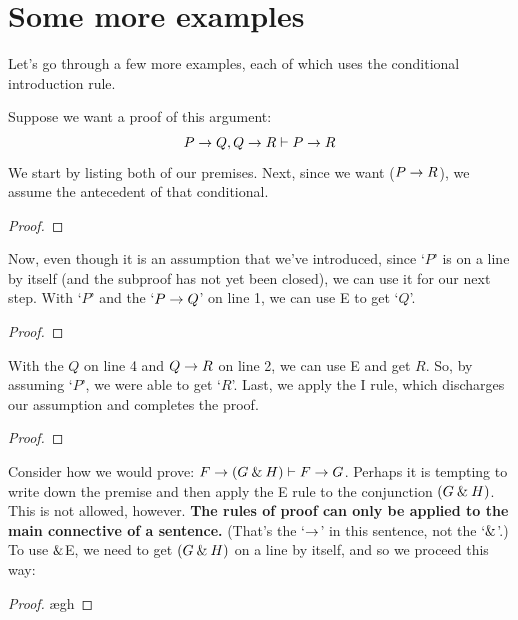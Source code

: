 \section{Some more examples}

Let's go through a few more examples, each of which uses the conditional introduction rule.

\begin{earg}
\item Suppose we want a proof of this argument:
	$$P \rightarrow Q, Q \rightarrow R \vdash P \rightarrow R$$
We start by listing both of our premises. Next, since we want ($P \rightarrow R$), we assume the antecedent of that conditional. 
\begin{proof}
	 \pr{}
	 \pr{}
	\open
		 \as{}
	\close
\end{proof}
Now, even though it is an assumption that we've introduced, since `$P$' is on a line by itself (and the subproof has not yet been closed), we can use it for our next step. With `$P$' and the `$P \rightarrow Q$' on line 1, we can use {\eif}E to get `$Q$'. 
\begin{proof}
	 \pr{}
	 \pr{}
	\open
		\as{}
	\close
\end{proof}
With the $Q$ on line 4 and $Q \rightarrow R$ on line 2, we can use {\eif}E and get $R$. So, by assuming `$P$', we were able to get `$R$'. Last, we apply the {\eif}I rule, which discharges our assumption and completes the proof.
\label{HSproof}
\begin{proof}
	 \pr{}
	 \pr{}
	\open
		\as{}
	\close
\end{proof}

\item Consider how we would prove: $F \rightarrow (G \mathbin{\&} H) \vdash F \rightarrow G$. Perhaps it is tempting to write down the premise and then apply the {\eand}E rule to the conjunction $(G \mathbin{\&} H)$. This is not allowed, however. \textbf{The rules of proof can only be applied to the main connective of a sentence.} (That's the `$\rightarrow$' in this sentence, not the `$\mathbin{\&}$'.) To use $\mathbin{\&}$E, we need to get $(G \mathbin{\&} H)$ on a line by itself, and so we proceed this way:

\begin{proof}
	 \pr{}
	\open
		\as{}
		\ae{gh}
	\close
\end{proof}


\end{earg}
